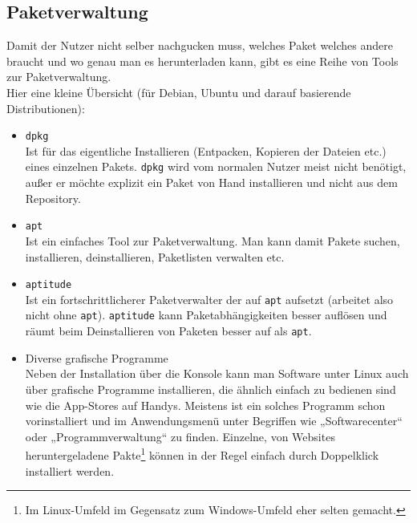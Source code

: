 \documentclass[a4paper,12pt]{article}
\begin{document}
\subsection{Paketverwaltung}
Damit der Nutzer nicht selber nachgucken muss, welches Paket welches 
andere braucht und wo genau man es herunterladen kann, gibt es eine 
Reihe von Tools zur Paketverwaltung.\\
Hier eine kleine Übersicht (für Debian, Ubuntu und darauf basierende
Distributionen):
\begin{itemize}
\item \texttt{dpkg} \\
Ist für das eigentliche Installieren (Entpacken, Kopieren der Dateien etc.) 
eines einzelnen Pakets. \texttt{dpkg} wird vom normalen Nutzer meist 
nicht benötigt, außer er möchte explizit ein Paket von Hand installieren 
und nicht aus dem Repository.
\item \texttt{apt} \\ 
Ist ein einfaches Tool zur Paketverwaltung. Man kann damit Pakete suchen, 
installieren, deinstallieren, Paketlisten verwalten etc.
\item \texttt{aptitude} \\ 
Ist ein fortschrittlicherer Paketverwalter der auf \texttt{apt} aufsetzt (arbeitet 
also nicht ohne \texttt{apt}). \texttt{aptitude} kann Paketabhängigkeiten besser 
auflösen und räumt beim Deinstallieren von Paketen besser auf als \texttt{apt}.
\item Diverse grafische Programme \\
Neben der Installation über die Konsole kann man Software unter Linux auch über grafische Programme installieren, die ähnlich einfach zu bedienen sind wie die App-Stores auf Handys. Meistens ist ein solches Programm schon vorinstalliert und im Anwendungsmenü unter Begriffen wie „Softwarecenter“ oder „Programmverwaltung“ zu finden. Einzelne, von Websites heruntergeladene Pakte\footnote{Im Linux-Umfeld im Gegensatz zum Windows-Umfeld eher selten gemacht.} können in der Regel einfach durch Doppelklick installiert werden.
\end{itemize}
\end{document}

